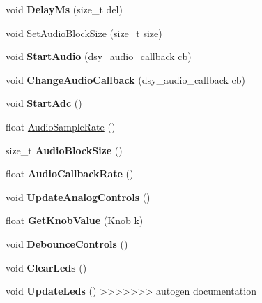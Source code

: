 \begin{DoxyCompactItemize}
\item 
\mbox{\label{classdaisy_1_1_daisy_pod_aa3b04ec95aefc30c988d1592e4bda854}} 
void {\bfseries Delay\+Ms} (size\+\_\+t del)
\item 
void \hyperlink{classdaisy_1_1_daisy_pod_a9d60832b58b339be50ad9c1a97de4aa9}{Set\+Audio\+Block\+Size} (size\+\_\+t size)
\item 
\mbox{\label{classdaisy_1_1_daisy_pod_a42a265de790f0c0a593fe3f6b86d8f57}} 
void {\bfseries Start\+Audio} (dsy\+\_\+audio\+\_\+callback cb)
\item 
\mbox{\label{classdaisy_1_1_daisy_pod_ade83eb95c214db9aed1cdca83f2c66cd}} 
void {\bfseries Change\+Audio\+Callback} (dsy\+\_\+audio\+\_\+callback cb)
\item 
\mbox{\label{classdaisy_1_1_daisy_pod_a84d2059ddd4a73f1689a0a083cbad5c9}} 
void {\bfseries Start\+Adc} ()
\item 
float \hyperlink{classdaisy_1_1_daisy_pod_a7fff4758f5ed4e41c8e6461e5751cbf5}{Audio\+Sample\+Rate} ()
\item 
\mbox{\label{classdaisy_1_1_daisy_pod_a1543bb453329304c5029cea09a3a553c}} 
size\+\_\+t {\bfseries Audio\+Block\+Size} ()
\item 
\mbox{\label{classdaisy_1_1_daisy_pod_a5fef78e3751c8edd1f39770f7d4ab4ef}} 
float {\bfseries Audio\+Callback\+Rate} ()
\item 
\mbox{\label{classdaisy_1_1_daisy_pod_af7bf2b3e6fa3a1f0f4a5d805198a3000}} 
void {\bfseries Update\+Analog\+Controls} ()
\item 
\mbox{\label{classdaisy_1_1_daisy_pod_a00421a85ddff302e22a9dc1fadeae728}} 
float {\bfseries Get\+Knob\+Value} (Knob k)
\item 
\mbox{\label{classdaisy_1_1_daisy_pod_ad87382f0c21b9f50d0cb68828a701fad}} 
void {\bfseries Debounce\+Controls} ()
\item 
\mbox{\label{classdaisy_1_1_daisy_pod_a18e61f431567a96a02b6c297a488b4b0}} 
void {\bfseries Clear\+Leds} ()
\item 
\mbox{\label{classdaisy_1_1_daisy_pod_a281dfdcdd82479625782174244324341}} 
void {\bfseries Update\+Leds} ()
>>>>>>> autogen documentation
\end{DoxyCompactItemize}
